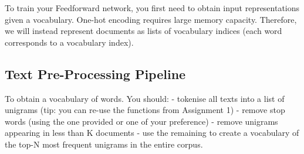 \documentclass[11pt]{article}
\begin{document}
To train your Feedforward network, you first need to obtain input
representations given a vocabulary. One-hot encoding requires large
memory capacity. Therefore, we will instead represent documents as lists
of vocabulary indices (each word corresponds to a vocabulary index).

\hypertarget{text-pre-processing-pipeline}{%
\subsection{Text Pre-Processing
Pipeline}\label{text-pre-processing-pipeline}}

To obtain a vocabulary of words. You should: - tokenise all texts into a
list of unigrams (tip: you can re-use the functions from Assignment 1) -
remove stop words (using the one provided or one of your preference) -
remove unigrams appearing in less than K documents - use the remaining
to create a vocabulary of the top-N most frequent unigrams in the entire
corpus.
\end{document}

